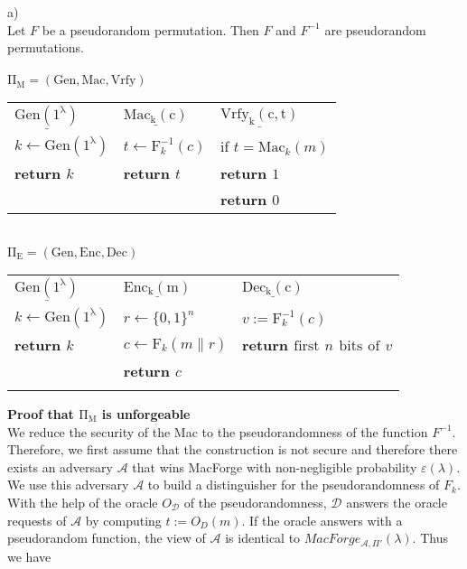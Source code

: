 \pagebreak
a)\\
Let $F$ be a pseudorandom permutation. Then $F$ and $F^{-1}$ are pseudorandom permutations.\\
\\
$\mathrm{\Pi_{M} = (Gen, Mac, Vrfy)}$\\
\vskip 0.05in
\begin{tabular}{l@{\hskip 1in}l@{\hskip 0.5in}l}
$\underline{\mathrm{Gen(1^{\lambda })}}$ & $\underline{\mathrm{Mac_{k}(c)}}$ & $\underline{\mathrm{Vrfy_{k}(c,t)}}$ \\
$k \leftarrow \mathrm{Gen(1^{\lambda})}$ & $t \leftarrow \mathrm{F}_{k}^{-1}(c)$ & if $t = \mathrm{Mac}_{k}(m)$\\
\bf{return} $k$ & \bf{return} $t$ & \indent\bf{return} $1$\\
 & & \bf{return} $0$\\
\end{tabular}\\
\vskip 1cm
\noindent$\mathrm{\Pi_{E} = (Gen, Enc, Dec)}$\\
\vskip 0.05in
\begin{tabular}{l@{\hskip 1in}l@{\hskip 0.5in}l}
$\underline{\mathrm{Gen(1^{\lambda })}}$ & $\underline{\mathrm{Enc_{k}(m)}}$ & $\underline{\mathrm{Dec_{k}(c)}}$ \\
$k \leftarrow \mathrm{Gen(1^{\lambda})}$ & $r \leftarrow \{0,1\}^{n}$ & $v := \mathrm{F}_{k}^{-1}(c)$\\
\bf{return} $k$ & $c \leftarrow \mathrm{F}_{k}(m \parallel r)$ & \bf{return} $\mathrm{first}$ $n$ $\mathrm{bits}$ $\mathrm{of}$  $v$  \\
 & \bf{return} $c$ &  \\
 & & \\
\end{tabular}
\vskip 1cm
\noindent\textbf{Proof that $\mathrm{\Pi_{M}}$ is unforgeable}\\
We reduce the security of the Mac to the pseudorandomness of the function $F^{-1}$.\\
Therefore, we first assume that the construction is not secure and therefore there exists an adversary $\mathcal{A}$ that wins MacForge with non-negligible probability $\varepsilon(\lambda )$. We use this adversary $\mathcal{A}$ to build a distinguisher for the pseudorandomness of $F_{k}$.\\
With the help of the oracle $O_{\mathcal{D}}$ of the pseudorandomness, $\mathcal{D}$ answers the oracle requests of $\mathcal{A}$ by computing $t := O_{D}(m)$. If the oracle answers with a pseudorandom function, the view of $\mathcal{A}$ is identical to $MacForge_{\mathcal{A},\Pi'}(\lambda)$. Thus we have \\
